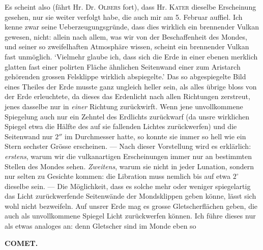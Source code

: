 Es scheint also (fährt Hr. Dr. \textsc{Olbers} fort), dass Hr. \textsc{Kater} dieselbe
Erscheinung gesehen, nur sie weiter verfolgt habe, die auch mir am 5. Februar auffiel.
Ich kenne zwar seine Ueberzeugungsgründe, dass dies wirklich ein brennender Vulkan
gewesen, nicht: allein nach allem, was wir von der Beschaffenheit des Mondes, und seiner
so zweifelhaften Atmosphäre wissen, scheint ein brennender Vulkan fast unmöglich.
`Vielmehr glaube ich, dass sich die Erde in einer ebenen merklich glatten fast einer
polirten Fläche ähnlichen Seitenwand einer zum Aristarch gehörenden grossen Felsklippe
wirklich abspiegelte.' Das so abgespiegelte Bild eines Theiles der Erde musste ganz
ungleich heller sein, als alles übrige bloss von der Erde erleuchtete, da dieses das
Erdenlicht nach allen Richtungen zerstreut, jenes dasselbe nur in \emph{einer} Richtung
zurückwirft. Wenn jene unvollkommene Spiegelung auch nur ein Zehntel des Erdlichts
zurückwarf (da unsre wirklichen Spiegel etwa die Hälfte des auf sie fallenden Lichtes
zurückwerfen) und die Seitenwand nur $2''$ im Durchmesser hatte, so konnte sie immer so
hell wie ein Stern sechster Grösse erscheinen. --- Nach dieser Vorstellung wird es
erklärlich: \emph{erstens}, warum wir die vulkanartigen Erscheinungen immer nur an
bestimmten Stellen des Mondes sehen. \emph{Zweitens}, warum sie nicht in jeder
Lunation, sondern nur selten zu Gesichte kommen: die Libration muss nemlich bis auf etwa
$2^\circ$ dieselbe sein. --- Die Möglichkeit, dass es solche mehr oder weniger
spiegelartig das Licht zurückwerfende Seitenwände der Mondsklippen geben könne, lässt
sich wohl nicht bezweifeln. Auf unsrer Erde mag es grosse Gletscherflächen geben, die
auch als unvollkommene Spiegel Licht zurückwerfen können. Ich führe dieses nur als etwas
analoges an: denn Gletscher sind im Monde eben so\par
\clearpage
\endgroup
\begingroup
\pagestyle{empty}
\newcommand{\GaussVIGathering}[2]{%
  \fancypagestyle{gaussVIGathering}{%
    \fancyhf{}%
    \renewcommand{\headrulewidth}{0pt}%
    \renewcommand{\footrulewidth}{0pt}%
    \fancyfoot[C]{\makebox[\textwidth][l]{%
      \hspace*{.025\textwidth}{\footnotesize\bfseries #1}\hfill
      {\normalsize\bfseries\textls[90]{#2}}\hspace*{.18\textwidth}}}%
  }%
  \thispagestyle{gaussVIGathering}%
}
\thispagestyle{empty}
\noindent{}%
\makebox[12mm][l]{}%
\parbox[t]{\dimexpr\linewidth-24mm\relax}{\centering\footnotesize\bfseries COMET.\par}%
